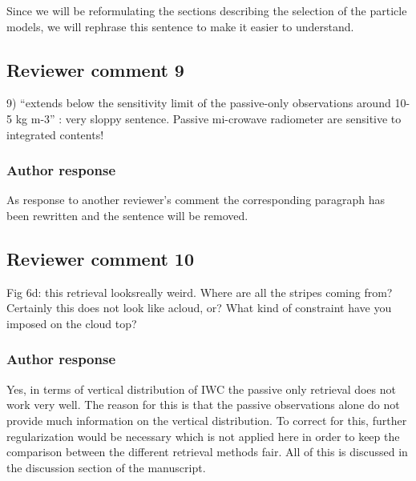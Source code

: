 \documentclass[11pt]{scrartcl}
\begin{document}
Since we will be reformulating the sections describing the selection of the
particle models, we will rephrase this sentence to make it easier to
understand.

\subsection*{Reviewer comment 9}
9) “extends below the sensitivity limit of the passive-only observations around 10-5 kg m-3” : very sloppy sentence. Passive mi-crowave radiometer are sensitive to integrated contents! 

\subsubsection*{Author response}

As response to another reviewer's comment the corresponding paragraph has been rewritten
and the sentence will be removed.



\subsection*{Reviewer comment 10}

 Fig 6d: this retrieval looksreally weird. Where are all the stripes coming from? Certainly this does not look like acloud, or? What kind of constraint have you imposed on the cloud top?

\subsubsection*{Author response}

Yes, in terms of vertical distribution of IWC the passive only retrieval does
not work very well. The reason for this is that the passive observations alone
do not provide much information on the vertical distribution. To correct for this,
further regularization would be necessary which is not applied here in order to
keep the comparison between the different retrieval methods fair. All of this
is discussed in the discussion section of the manuscript.
\end{document}
